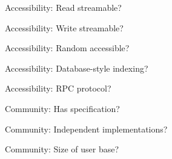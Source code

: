 \documentclass[aspectratio=169]{beamer}
\begin{document}
\begin{frame}{Accessibility: Read streamable?}
\vspace{0.5 cm}




\end{frame}

\begin{frame}{Accessibility: Write streamable?}
\vspace{0.5 cm}
\end{frame}

\begin{frame}{Accessibility: Random accessible?}
\vspace{0.5 cm}
\end{frame}

\begin{frame}{Accessibility: Database-style indexing?}
\vspace{0.5 cm}
\end{frame}

\begin{frame}{Accessibility: RPC protocol?}
\vspace{0.5 cm}
\end{frame}

\begin{frame}{Community: Has specification?}
\vspace{0.5 cm}
\end{frame}

\begin{frame}{Community: Independent implementations?}
\vspace{0.5 cm}
\end{frame}

\begin{frame}{Community: Size of user base?}
\vspace{0.5 cm}
\end{frame}
\end{document}
